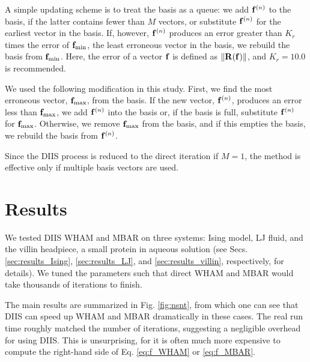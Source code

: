 \documentclass[reprint,aip,jcp,superscriptaddress]{revtex4-1}
\begin{document}
A simple updating scheme\cite{kovalenko1999}
is to treat the basis as a queue:
%
we add $\mathbf{f}^{(n)}$ to the basis,
if the latter contains fewer than $M$ vectors,
%
or substitute $\mathbf{f}^{(n)}$ for the earliest vector in the basis.
%
If, however, $\mathbf{f}^{(n)}$
produces an error greater than
$K_r$ times the error of
$\mathbf{f}_\mathrm{min}$,
the least erroneous vector in the basis,
%
we rebuild the basis
from $\mathbf{f}_\mathrm{min}$.
%
Here, the error of a vector $\mathbf{f}$ is defined as
$\| \mathbf{R}(\mathbf{f}) \|$,
and
$K_r = 10.0$ is recommended\cite{
kovalenko1999}.



We used the following modification
in this study.
%
%
%
%
First, we find the most erroneous vector,
$\mathbf{f}_\mathrm{max}$, from the basis.
%
If the new vector, $\mathbf{f}^{(n)}$,
produces an error less than $\mathbf{f}_\mathrm{max}$,
we add $\mathbf{f}^{(n)}$ into the basis
or, if the basis is full,
substitute $\mathbf{f}^{(n)}$ for $\mathbf{f}_\mathrm{max}$.
%
Otherwise,
we remove $\mathbf{f}_\mathrm{max}$ from the basis,
and if this empties the basis,
we rebuild the basis from $\mathbf{f}^{(n)}$.



Since the DIIS process is reduced
to the direct iteration
if $M = 1$,
the method is effective
only if multiple basis vectors are used.
%




\section{Results}





We tested DIIS WHAM and MBAR on three systems:
Ising model, LJ fluid,
and the villin headpiece, a small protein in aqueous solution
(see Secs.
\ref{sec:results_Ising}, \ref{sec:results_LJ}, and
\ref{sec:results_villin},
respectively,
for details).
%
We tuned the parameters
such that direct WHAM and MBAR
would take thousands of iterations
to finish.



The main results
are summarized
in Fig. \ref{fig:nsnt},
from which one can see that
DIIS can speed up WHAM and MBAR
dramatically in these cases.
%
The real run time roughly matched
the number of iterations,
suggesting a negligible overhead for using DIIS.
%
This is unsurprising,
for it is often much more expensive to compute
the right-hand side of
Eq. \eqref{eq:f_WHAM} or \eqref{eq:f_MBAR}.
\end{document}
